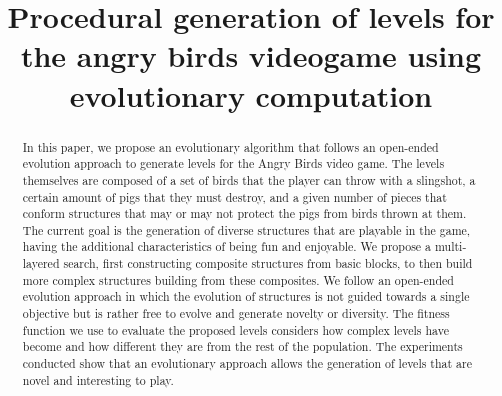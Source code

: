 \documentclass[conference]{IEEEtran}
\begin{document}
\title{Procedural generation of levels for the angry birds videogame using
evolutionary computation\\
}

\author{
\and
{} 
\and
{} }

\maketitle


\begin{abstract}
In this paper, we propose an evolutionary algorithm that follows an open-ended
evolution approach to generate levels for the Angry Birds video game. The levels
themselves are composed of a set of birds that the player can throw with a
slingshot, a certain amount of pigs that they must destroy, and a given number
of pieces that conform structures that may or may not protect the pigs from
birds thrown at them. The current goal is the generation of diverse structures
that are playable in the game, having the additional characteristics of being
fun and enjoyable. We propose a multi-layered search, first constructing
composite structures from basic blocks, to then build more complex structures
building from these composites. We follow an open-ended evolution approach in
which the evolution of structures is not guided towards a single objective but
is rather free to evolve and generate novelty or diversity. The fitness function
we use to evaluate the proposed levels considers how complex levels have become
and how different they are from the rest of the population. The experiments
conducted show that an evolutionary approach allows the generation of levels
that are novel and interesting to play.
\end{abstract}
\end{document}
